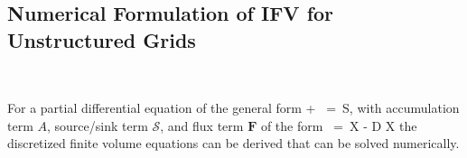 \documentclass[12pt]{article}
\def\EQ#1\EN{\begin{equation}#1\end{equation}}
\newcommand{\eq}{\ =\ }
\newcommand{\p}{{\partial}}
\renewcommand{\S}{{\mathcal S}}
\newcommand{\bnabla}{\boldsymbol{\nabla}}
\newcommand{\bF}{\boldsymbol{F}}
\newcommand{\bq}{\boldsymbol{q}}
\begin{document}
\subsection*{Numerical Formulation of IFV for Unstructured Grids}
\vspace{-16pt}
~
\indent

For a partial differential equation of the general form
\EQ
\frac{\p A}{\p t} + \bnabla\cdot\bF \eq \S,
\EN
with accumulation term $A$, source/sink term $\S$, and flux term $\bF$ of the form
\EQ
\bF \eq \bq\rho X - \phi D \rho\bnabla X
\EN
the discretized finite volume equations can be derived that can be solved numerically. 
\end{document}
